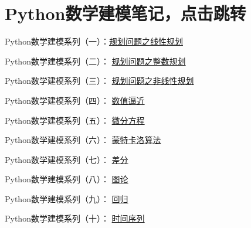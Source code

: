 \documentclass[lang=cn,newtx,10pt,scheme=chinese]{elegantbook}
\begin{document}
\frontmatter

\newpage

\section*{Python数学建模笔记，点击跳转}

Python数学建模系列（一）：\href{https://mp.weixin.qq.com/s/qfhzD_mmhBCqREjIvGA3AQ}{规划问题之线性规划}


Python数学建模系列（二）：
\href{https://mp.weixin.qq.com/s/O7YIWsJZY6rWfbqsjcv88g }{规划问题之整数规划}

Python数学建模系列（三）：
\href{https://mp.weixin.qq.com/s/ghnolgT_WYXc5-5yIovJ3Q  }{规划问题之非线性规划}

Python数学建模系列（四）：
\href{https://mp.weixin.qq.com/s/M1lgRk--Dm302KhudwJf1A}{数值逼近}

Python数学建模系列（五）：
\href{https://mp.weixin.qq.com/s/JiQWHnd1CgjAUeonkE0NfQ}{微分方程}

Python数学建模系列（六）：
\href{https://mp.weixin.qq.com/s/H69Me6ZnrVSlkdoVIQ2-gA}{蒙特卡洛算法}

Python数学建模系列（七）：
\href{https://mp.weixin.qq.com/s/cx2A515XeZ9bJlY7Hp7_5A}{差分}

Python数学建模系列（八）：
\href{https://mp.weixin.qq.com/s/qRABXkYQh3r5NTD0CohQfQ}{图论}

Python数学建模系列（九）：
\href{https://mp.weixin.qq.com/s/TQfTNZ9TumFvuo5t9NcnNQ}{回归}

Python数学建模系列（十）：
\href{https://mp.weixin.qq.com/s/PujMd1a_Uxa2Y78HpO7Vnw}{时间序列}


\end{document}
